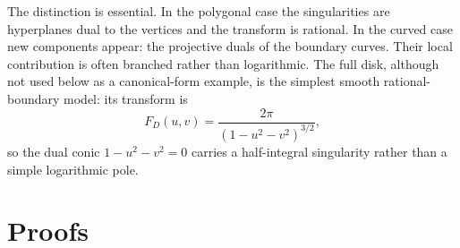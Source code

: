 \documentclass[10pt,a4paper,reqno]{amsart}
\theoremstyle{plain}
\theoremstyle{definition}
\begin{document}
The distinction is essential.  In the polygonal case the singularities are
hyperplanes dual to the vertices and the transform is rational.  In the curved
case new components appear: the projective duals of the boundary curves.  Their
local contribution is often branched rather than logarithmic.  The full disk, although not used below as a canonical-form example, is
the simplest smooth rational-boundary model: its transform is
\[
        F_D(u,v)=\frac{2\pi}{(1-u^2-v^2)^{3/2}},
\]
so the dual conic $1-u^2-v^2=0$ carries a half-integral singularity rather than
a simple logarithmic pole.

\section {Proofs}\label{sec:proofs}
 
\end{document}
